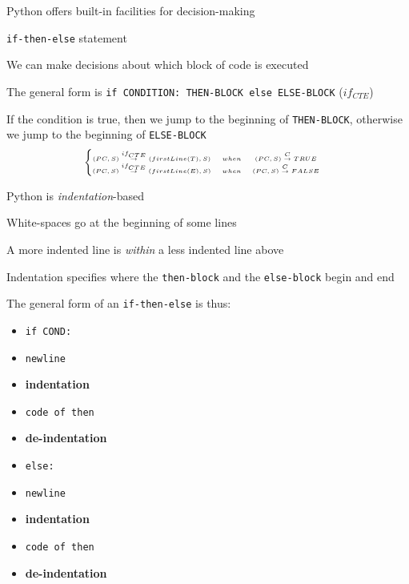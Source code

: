 \documentclass{beamer}
\begin{document}
\begin{slide}{
\item Python offers built-in facilities for decision-making
\item \texttt{if-then-else} statement
\item We can make decisions about which block of code is executed
}\end{slide}

\begin{slide}{
\item The general form is \texttt{if CONDITION: THEN-BLOCK else ELSE-BLOCK} ($if_{CTE}$)
\item If the condition is true, then we jump to the beginning of \texttt{THEN-BLOCK}, otherwise we jump to the beginning of \texttt{ELSE-BLOCK}
$$
\tiny
\left\{
\begin{matrix}
(PC,S) \overset{if_{CTE}}{\rightarrow} (firstLine(T),S) &when& (PC,S) \overset{C}{\rightarrow} TRUE & \\
(PC,S) \overset{if_{CTE}}{\rightarrow} (firstLine(E),S) &when& (PC,S) \overset{C}{\rightarrow} FALSE & \\
\end{matrix}
\right.
$$
}\end{slide}

\begin{slide}{
\item Python is \textit{indentation}-based
\item White-spaces go at the beginning of some lines
\item A more indented line is \textit{within} a less indented line above
}\end{slide}

\begin{slide}{
\item Indentation specifies where the \texttt{then-block} and the \texttt{else-block} begin and end
\item The general form of an \texttt{if-then-else} is thus:
\begin{itemize}
\item \texttt{if COND:}
\item \texttt{newline}
\item \textbf{indentation}
\item \texttt{code of then}
\item \textbf{de-indentation}
\item \texttt{else:}
\item \texttt{newline}
\item \textbf{indentation}
\item \texttt{code of then}
\item \textbf{de-indentation}
\end{itemize}
}\end{slide}
\end{document}
